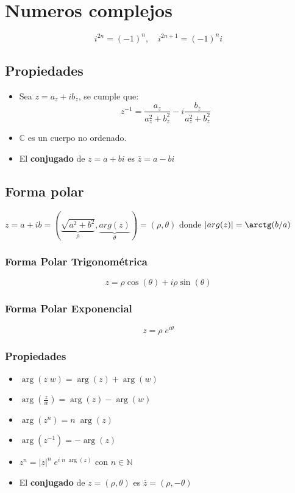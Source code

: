 \section{Numeros complejos}
\[ i^{2n} = (-1)^n, \quad i^{2n+1} = (-1)^n i \]

\subsection{Propiedades}
\begin{itemize}
\item Sea $z = a_z + i b_z$, se cumple que:
\[z^{-1} = \frac{a_z}{a_z^2 + b_z^2} - i\frac{b_z}{a_z^2 + b_z^2}\]
\item \( \mathbb{C} \) es un cuerpo no ordenado.
\item El \textbf{conjugado} de \(z = a + bi\) es \(\overline{z} = a - bi\)
\end{itemize}
\subsection{Forma polar}
\(z = a + ib = \left(\underbrace{\sqrt{a^2+ b^2}}_{\rho}, \underbrace{arg(z)}_{\theta}\right) = (\rho, \theta)\) donde \(|arg(z)| = \arctg(b/a)\)
\subsubsection{Forma Polar Trigonométrica}
\[z = \rho \cos(\theta) + i \rho \sin(\theta)\]
\subsubsection{Forma Polar Exponencial}
\[z = \rho \; e^{i\theta}\]
\subsubsection{Propiedades}
\begin{itemize}
    \item \(\arg(z \; w) = \arg(z) + \arg(w)\)
    \item \(\arg(\frac{z}{w}) = \arg(z) - \arg(w)\)
    \item \(\arg(z^n) = n \; \arg(z)\)
    \item \(\arg(z^{-1}) = -\arg(z)\)
    \item \(z^n = |z|^n \; e^{i \; n \; \arg(z)}\) con \(n \in \mathbb{N}\)
    \item El \textbf{conjugado} de \(z = (\rho, \theta)\) es \(\overline{z} = (\rho, -\theta)\)
\end{itemize}
